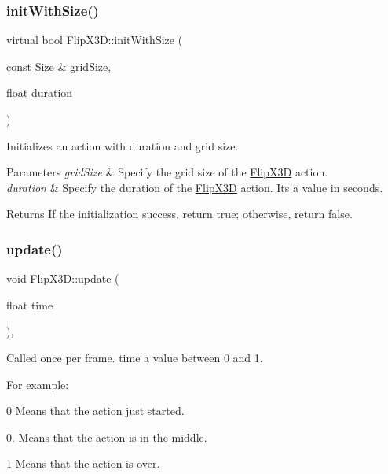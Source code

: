 \subsubsection{\texorpdfstring{init\+With\+Size()}{initWithSize()}\hspace{0.1cm}{\footnotesize\ttfamily [2/2]}}
{\footnotesize\ttfamily virtual bool Flip\+X3\+D\+::init\+With\+Size (\begin{DoxyParamCaption}\item[{const \hyperlink{classSize}{Size} \&}]{grid\+Size,  }\item[{float}]{duration }\end{DoxyParamCaption})\hspace{0.3cm}{\ttfamily [virtual]}}



Initializes an action with duration and grid size. 


\begin{DoxyParams}{Parameters}
{\em grid\+Size} & Specify the grid size of the \hyperlink{classFlipX3D}{Flip\+X3D} action. \\
\hline
{\em duration} & Specify the duration of the \hyperlink{classFlipX3D}{Flip\+X3D} action. It\textquotesingle{}s a value in seconds. \\
\hline
\end{DoxyParams}
\begin{DoxyReturn}{Returns}
If the initialization success, return true; otherwise, return false. 
\end{DoxyReturn}
\mbox{\label{classFlipX3D_a6f3b43c2a5cf49ed00a373bf54cd97e9}} 
\subsubsection{\texorpdfstring{update()}{update()}\hspace{0.1cm}{\footnotesize\ttfamily [1/2]}}
{\footnotesize\ttfamily void Flip\+X3\+D\+::update (\begin{DoxyParamCaption}\item[{float}]{time }\end{DoxyParamCaption})\hspace{0.3cm}{\ttfamily [override]}, {\ttfamily [virtual]}}

Called once per frame. time a value between 0 and 1.

For example\+:
\begin{DoxyItemize}
\item 0 Means that the action just started.
\item 0. Means that the action is in the middle.
\item 1 Means that the action is over.
\end{DoxyItemize}


